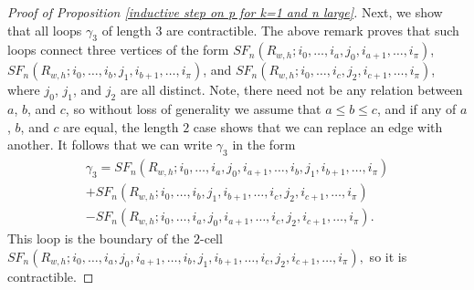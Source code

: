 \documentclass[pagebackref,colorlinks,citecolor=blue,linkcolor=blue,urlcolor=blue,filecolor=blue]{article}
\theoremstyle{definition}\newtheorem{definition}[thm]{Definition}
\theoremstyle{definition}
\begin{document}
\begin{proof}[Proof of Proposition \ref{inductive step on p for k=1 and n large}]
Next, we show that all loops $\gamma_{3}$ of length $3$ are contractible. 
The above remark proves that such loops connect three vertices of the form $SF_{n}(R_{w, h}; i_{0}, \dots, i_{a}, j_{0}, i_{a+1}, \dots, i_{\pi})$, $SF_{n}(R_{w, h}; i_{0}, \dots, i_{b}, j_{1}, i_{b+1}, \dots, i_{\pi})$, and $SF_{n}(R_{w, h}; i_{0}, \dots, i_{c}, j_{2}, i_{c+1}, \dots, i_{\pi})$, where $j_{0}$, $j_{1}$, and $j_{2}$ are all distinct.
Note, there need not be any relation between $a$, $b$, and $c$, so without loss of generality we assume that $a\le b\le c$, and if any of $a$, $b$, and $c$ are equal, the length $2$ case shows that we can replace an edge with another.
It follows that we can write $\gamma_{3}$ in the form
\begin{multline*}
\gamma_{3}=SF_{n}(R_{w, h}; i_{0}, \dots, i_{a}, j_{0}, i_{a+1}, \dots, i_{b}, j_{1}, i_{b+1},\dots, i_{\pi})\\
+SF_{n}(R_{w, h}; i_{0}, \dots, i_{b}, j_{1}, i_{b+1}, \dots, i_{c}, j_{2}, i_{c+1},\dots, i_{\pi})\\
-SF_{n}(R_{w, h}; i_{0}, \dots, i_{a}, j_{0}, i_{a+1}, \dots, i_{c}, j_{2}, i_{c+1},\dots, i_{\pi}).
\end{multline*}
This loop is the boundary of the $2$-cell $SF_{n}(R_{w, h}; i_{0},\dots, i_{a}, j_{0}, i_{a+1},\dots, i_{b}, j_{1}, i_{b+1}, \dots, i_{c}, j_{2}, i_{c+1}, \dots, i_{\pi}),$ so it is contractible.


\end{proof}
\end{document}
